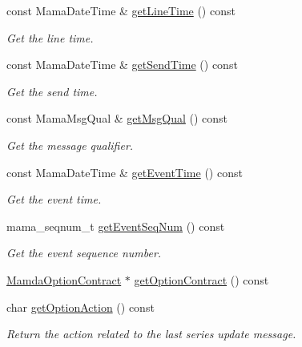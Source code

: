 \begin{CompactItemize}
const Mama\-Date\-Time \& \hyperlink{classWombat_1_1MamdaOptionChainListener_4d3d107d4aea29b42a262071c0a4d0ed}{get\-Line\-Time} () const 
\begin{CompactList}\small\item\em Get the line time. \item\end{CompactList}\item 
const Mama\-Date\-Time \& \hyperlink{classWombat_1_1MamdaOptionChainListener_81cfb2c76079da7867841b94da24b6de}{get\-Send\-Time} () const 
\begin{CompactList}\small\item\em Get the send time. \item\end{CompactList}\item 
const Mama\-Msg\-Qual \& \hyperlink{classWombat_1_1MamdaOptionChainListener_18b3d2b0c1db64719b2693e89d5583e5}{get\-Msg\-Qual} () const 
\begin{CompactList}\small\item\em Get the message qualifier. \item\end{CompactList}\item 
const Mama\-Date\-Time \& \hyperlink{classWombat_1_1MamdaOptionChainListener_5cf26056ce6135a00627d5efea861dfc}{get\-Event\-Time} () const 
\begin{CompactList}\small\item\em Get the event time. \item\end{CompactList}\item 
mama\_\-seqnum\_\-t \hyperlink{classWombat_1_1MamdaOptionChainListener_936a15ecd68edbee310aba01fc7ae7b5}{get\-Event\-Seq\-Num} () const 
\begin{CompactList}\small\item\em Get the event sequence number. \item\end{CompactList}\item 
\hyperlink{classWombat_1_1MamdaOptionContract}{Mamda\-Option\-Contract} $\ast$ \hyperlink{classWombat_1_1MamdaOptionChainListener_af867698910e7291e62db6ecc8e47799}{get\-Option\-Contract} () const 
\item 
char \hyperlink{classWombat_1_1MamdaOptionChainListener_b1606745ac13faa4da7d9318705491a6}{get\-Option\-Action} () const 
\begin{CompactList}\small\item\em Return the action related to the last series update message. \item\end{CompactList}\item 

\end{CompactItemize}
